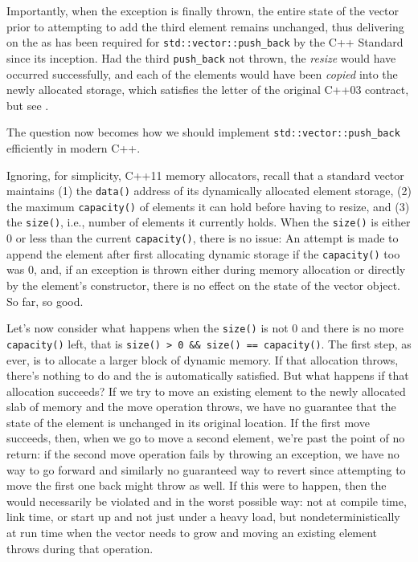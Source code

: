 \noindent Importantly, when the exception is finally thrown, the entire state of
the vector prior to attempting to add the third element remains
unchanged, thus delivering on the  as has been required for \lstinline!std::vector::push_back! by
the C++ Standard since its inception. Had the third \lstinline!push_back!
not thrown, the \emph{resize} would have occurred successfully, and each
of the elements would have been \emph{copied} into the newly allocated
storage, which satisfies the letter of the original C++03 contract, but
see .

The question now becomes how we should implement
\lstinline!std::vector::push_back! efficiently in modern C++.

Ignoring, for simplicity, C++11 memory allocators, recall that a
standard vector maintains (1) the \lstinline!data()! address of its
dynamically allocated element storage, (2) the maximum
\lstinline!capacity()! of elements it can hold before having to resize, and
(3) the \lstinline!size()!, i.e., number of elements it currently holds.
When the \lstinline!size()! is either 0 or less than the current
\lstinline!capacity()!, there is no issue: An attempt is made to append the
element after first allocating dynamic storage if the
\lstinline!capacity()! too was 0, and, if an exception is thrown either
during memory allocation or directly by the element's constructor, there
is no effect on the state of the vector object. So far, so good.

Let's now consider what happens when the \lstinline!size()! is not 0 and
there is no more \lstinline!capacity()! left, that is
\lstinline!size()!~\lstinline!>!~\lstinline!0!~\lstinline!&&!~\lstinline!size()!~\lstinline!==!~\lstinline!capacity()!.
The first step, as ever, is to allocate a larger block of dynamic
memory. If that allocation throws, there's nothing to do and the
 is automatically satisfied. But what happens
if that allocation succeeds? If we try to move an existing element to
the newly allocated slab of memory and the move operation throws, we
have no guarantee that the state of the element is unchanged in its
original location. If the first move succeeds, then, when we go to move
a second element, we're past the point of no return: if the second move
operation fails by throwing an exception, we have no way to go forward
and similarly no guaranteed way to revert since attempting to move the
first one back might throw as well. If this were to happen, then the
 would necessarily be violated
and in the worst possible way: not at compile time, link time, or start
up and not just under a heavy load, but nondeterministically at run time
when the vector needs to grow and moving an existing element throws
during that operation.

